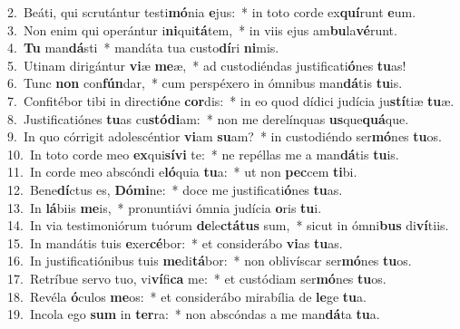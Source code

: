 {2.~}Beáti, qui scrutántur testi\textbf{mó}nia \textbf{e}jus:~* in toto corde ex\textbf{quí}runt \textbf{e}um.\\
{3.~}Non enim qui operántur i\textbf{ni}qui\textbf{tá}tem,~* in viis ejus am\textbf{bu}la\textbf{vé}runt.\\
{4.~}\textbf{Tu} man\textbf{dá}sti~* mandáta tua custo\textbf{dí}ri \textbf{ni}mis.\\
{5.~}Utinam dirigántur \textbf{vi}æ \textbf{me}æ,~* ad custodiéndas justificati\textbf{ó}nes \textbf{tu}as!\\
{6.~}Tunc \textbf{non} con\textbf{fún}dar,~* cum perspéxero in ómnibus man\textbf{dá}tis \textbf{tu}is.\\
{7.~}Confitébor tibi in directi\textbf{ó}ne \textbf{cor}dis:~* in eo quod dídici judícia ju\textbf{stí}tiæ \textbf{tu}æ.\\
{8.~}Justificatiónes \textbf{tu}as cu\textbf{stó}\textbf{di}am:~* non me derelínquas \textbf{us}que\textbf{quá}que.\\
{9.~}In quo córrigit adolescéntior \textbf{vi}am \textbf{su}am?~* in custodiéndo ser\textbf{mó}nes \textbf{tu}os.\\
{10.~}In toto corde meo \textbf{ex}qui\textbf{sí}\textbf{vi} te:~* ne repéllas me a man\textbf{dá}tis \textbf{tu}is.\\
{11.~}In corde meo abscóndi e\textbf{ló}quia \textbf{tu}a:~* ut non \textbf{pec}cem \textbf{ti}bi.\\
{12.~}Bene\textbf{dí}ctus es, \textbf{Dó}\textbf{mi}ne:~* doce me justificati\textbf{ó}nes \textbf{tu}as.\\
{13.~}In \textbf{lá}biis \textbf{me}is,~* pronuntiávi ómnia judícia \textbf{o}ris \textbf{tu}i.\\
{14.~}In via testimoniórum tuórum \textbf{de}le\textbf{ctá}\textbf{tus} sum,~* sicut in ómni\textbf{bus} di\textbf{ví}tiis.\\
{15.~}In mandátis tuis \textbf{e}xer\textbf{cé}bor:~* et considerábo \textbf{vi}as \textbf{tu}as.\\
{16.~}In justificatiónibus tuis \textbf{me}di\textbf{tá}bor:~* non oblivíscar ser\textbf{mó}nes \textbf{tu}os.\\
{17.~}Retríbue servo tuo, vi\textbf{ví}fi\textbf{ca} me:~* et custódiam ser\textbf{mó}nes \textbf{tu}os.\\
{18.~}Revéla \textbf{ó}culos \textbf{me}os:~* et considerábo mirabília de \textbf{le}ge \textbf{tu}a.\\
{19.~}Incola ego \textbf{sum} in \textbf{ter}ra:~* non abscóndas a me man\textbf{dá}ta \textbf{tu}a.\\
